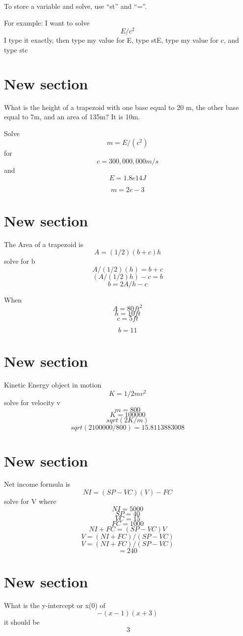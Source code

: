 \documentclass{article}
\begin{document}
To store a variable and solve, use ``st'' and ``=''.

For example: I want to solve $$E/c^2$$
I type it exactly, then type my value for E, type stE, type my value for c, and type stc

\section{New section}
What is the height of a trapezoid with one base equal to 20 m, the other base equal to 7m, and an area of 135m? It is 10m.

Solve $$m=E/(c^2)$$ for $$c = 300,000,000 m/s$$ and $$E = 1.8e14J$$

$$m = 2e-3$$

\section{New section}
The Area of a trapezoid is $$A=(1/2)(b+c)h $$ solve for b
$$A/(1/2)(h)=b+c$$
$$(A/(1/2)h)-c=b$$
$$b = 2 A / h - c $$

When $$A=80ft^2$$ $$h=10ft$$ $$c=5ft$$

$$b=11$$

\section{New section}
Kinetic Energy object in motion $$K=1/2mv^2$$ solve for velocity v
$$m=800$$
$$K=100000$$
$$sqrt(2K/m)$$
$$sqrt(2 100000/800) = 15.8113883008$$

\section{New section}
Net income formula is $$NI=(SP-VC)(V)-FC$$ solve for V where
$$NI=5000$$
$$SP=40$$
$$VC=15$$
$$FC=1000$$
$$NI+FC=(SP-VC)V$$
$$V=(NI+FC)/(SP-VC)$$
$$V=(NI+FC)/(SP-VC)$$
$$=240$$

\section{New section}

What is the y-intercept or x(0) of $$-(x-1)(x+3)$$ it should be $$~3$$
\end{document}

